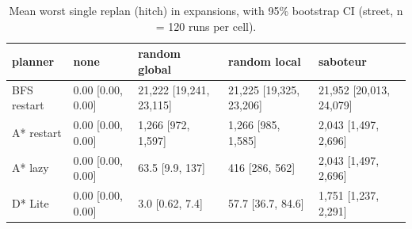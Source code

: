 \begin{table}[t]
\centering
\small
\caption{Mean worst single replan (hitch) in expansions, with 95\% bootstrap CI (street, n = 120 runs per cell).}
\label{tab:hitch-street}
\begin{tabular}{lllll}
\toprule
planner & none & random global & random local & saboteur \\
\midrule
BFS restart & 0.00 [0.00, 0.00] & 21,222 [19,241, 23,115] & 21,225 [19,325, 23,206] & 21,952 [20,013, 24,079] \\
A* restart & 0.00 [0.00, 0.00] & 1,266 [972, 1,597] & 1,266 [985, 1,585] & 2,043 [1,497, 2,696] \\
A* lazy & 0.00 [0.00, 0.00] & 63.5 [9.9, 137] & 416 [286, 562] & 2,043 [1,497, 2,696] \\
D* Lite & 0.00 [0.00, 0.00] & 3.0 [0.62, 7.4] & 57.7 [36.7, 84.6] & 1,751 [1,237, 2,291] \\
\bottomrule
\end{tabular}
\end{table}
